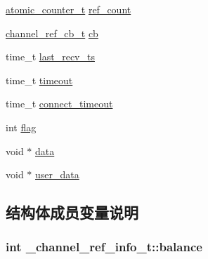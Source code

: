 \begin{DoxyCompactItemize}
\item 
\hyperlink{a00050_a0d043bbb6b8db19fea54ab9271d352b6_a0d043bbb6b8db19fea54ab9271d352b6}{atomic\+\_\+counter\+\_\+t} \hyperlink{a00004_a3d1b48975129aa0f05c24585077470db_a3d1b48975129aa0f05c24585077470db}{ref\+\_\+count}
\item 
\hyperlink{a00050_ae296ec4d1ce108960de8dcc423956a1d_ae296ec4d1ce108960de8dcc423956a1d}{channel\+\_\+ref\+\_\+cb\+\_\+t} \hyperlink{a00004_ab7b33eecec8260ab80193fd1993b5297_ab7b33eecec8260ab80193fd1993b5297}{cb}
\item 
time\+\_\+t \hyperlink{a00004_a405671b2411da0242396a548a786dae7_a405671b2411da0242396a548a786dae7}{last\+\_\+recv\+\_\+ts}
\item 
time\+\_\+t \hyperlink{a00004_a8bc54a1cbfc3bab17586ca3bfae321b4_a8bc54a1cbfc3bab17586ca3bfae321b4}{timeout}
\item 
time\+\_\+t \hyperlink{a00004_a354fdca953fc556698030d54f8e5e520_a354fdca953fc556698030d54f8e5e520}{connect\+\_\+timeout}
\item 
int \hyperlink{a00004_ad7a3ab8de29fbde1ca62d8459549549d_ad7a3ab8de29fbde1ca62d8459549549d}{flag}
\item 
void $\ast$ \hyperlink{a00004_ae85e1d9615c6286e12882ccb7aebc195_ae85e1d9615c6286e12882ccb7aebc195}{data}
\item 
void $\ast$ \hyperlink{a00004_a1dff9bf18d0c5b4591b31bc5929422a5_a1dff9bf18d0c5b4591b31bc5929422a5}{user\+\_\+data}
\end{DoxyCompactItemize}


\subsection{结构体成员变量说明}
\hypertarget{a00004_a99bd34912f0ef9a5cdacd9df9c355ce5_a99bd34912f0ef9a5cdacd9df9c355ce5}{}
\subsubsection[{balance}]{\setlength{\rightskip}{0pt plus 5cm}int \+\_\+channel\+\_\+ref\+\_\+info\+\_\+t\+::balance}\label{a00004_a99bd34912f0ef9a5cdacd9df9c355ce5_a99bd34912f0ef9a5cdacd9df9c355ce5}
\hypertarget{a00004_ab7b33eecec8260ab80193fd1993b5297_ab7b33eecec8260ab80193fd1993b5297}{}
